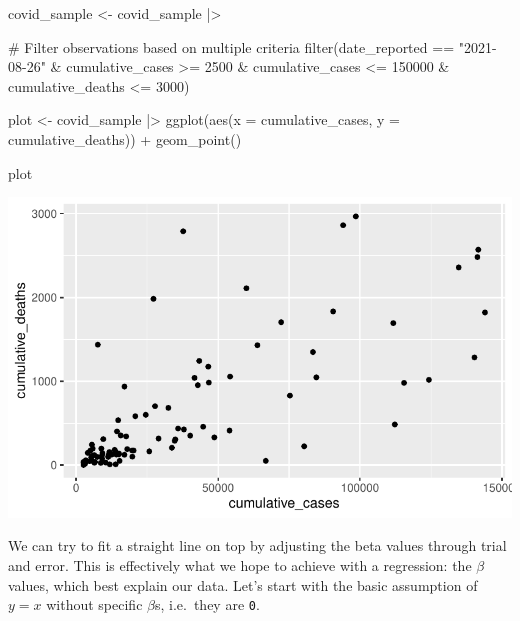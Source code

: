\documentclass[
  letterpaper,
  DIV=11,
  numbers=noendperiod]{scrreprt}
\newenvironment{Shaded}{\begin{snugshade}}{\end{snugshade}}
\newcommand{\AttributeTok}[1]{\textcolor[rgb]{0.40,0.45,0.13}{#1}}
\newcommand{\CommentTok}[1]{\textcolor[rgb]{0.37,0.37,0.37}{#1}}
\newcommand{\DecValTok}[1]{\textcolor[rgb]{0.68,0.00,0.00}{#1}}
\newcommand{\FunctionTok}[1]{\textcolor[rgb]{0.28,0.35,0.67}{#1}}
\newcommand{\NormalTok}[1]{\textcolor[rgb]{0.00,0.23,0.31}{#1}}
\newcommand{\OtherTok}[1]{\textcolor[rgb]{0.00,0.23,0.31}{#1}}
\newcommand{\SpecialCharTok}[1]{\textcolor[rgb]{0.37,0.37,0.37}{#1}}
\newcommand{\StringTok}[1]{\textcolor[rgb]{0.13,0.47,0.30}{#1}}
\begin{document}
\begin{Shaded}
\begin{Highlighting}[]
\NormalTok{covid\_sample }\OtherTok{\textless{}{-}}
\NormalTok{  covid\_sample }\SpecialCharTok{|\textgreater{}}
  
  \CommentTok{\# Filter observations based on multiple criteria}
  \FunctionTok{filter}\NormalTok{(date\_reported }\SpecialCharTok{==} \StringTok{"2021{-}08{-}26"} \SpecialCharTok{\&}
\NormalTok{           cumulative\_cases }\SpecialCharTok{\textgreater{}=} \DecValTok{2500} \SpecialCharTok{\&}
\NormalTok{           cumulative\_cases }\SpecialCharTok{\textless{}=} \DecValTok{150000} \SpecialCharTok{\&}
\NormalTok{           cumulative\_deaths }\SpecialCharTok{\textless{}=} \DecValTok{3000}\NormalTok{)}

\NormalTok{plot }\OtherTok{\textless{}{-}}\NormalTok{ covid\_sample }\SpecialCharTok{|\textgreater{}}
  \FunctionTok{ggplot}\NormalTok{(}\FunctionTok{aes}\NormalTok{(}\AttributeTok{x =}\NormalTok{ cumulative\_cases,}
             \AttributeTok{y =}\NormalTok{ cumulative\_deaths)) }\SpecialCharTok{+}
  \FunctionTok{geom\_point}\NormalTok{()}

\NormalTok{plot}
\end{Highlighting}
\end{Shaded}

\includegraphics{13_regressions_files/figure-latex/fitting-model-by hand-step-three-1.pdf}

We can try to fit a straight line on top by adjusting the beta values
through trial and error. This is effectively what we hope to achieve
with a regression: the \(\beta\) values, which best explain our data.
Let's start with the basic assumption of \(y = x\) without specific
\(\beta\)s, i.e.~they are \texttt{0}.
\end{document}
